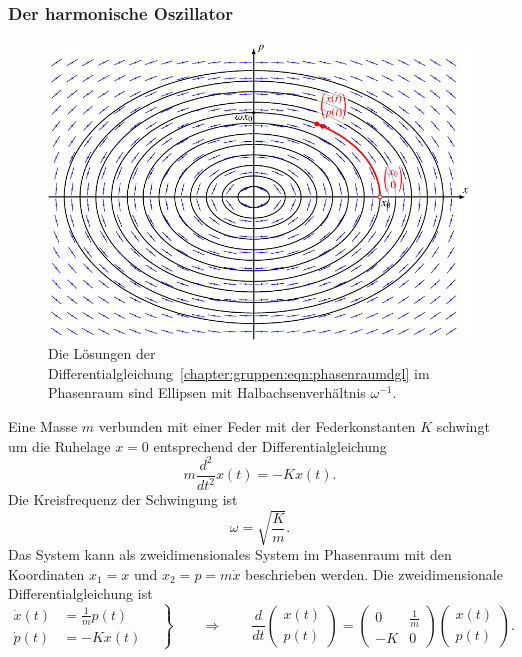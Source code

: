 \subsubsection{Der harmonische Oszillator}
\begin{figure}
\centering
\includegraphics{chapters/60-gruppen/images/phasenraum.pdf}
\caption{Die Lösungen der
Differentialgleichung~\eqref{chapter:gruppen:eqn:phasenraumdgl}
im Phasenraum sind Ellipsen mit Halbachsenverhältnis $\omega^{-1}$.
\label{chapter:gruppen:fig:phasenraum}}
\end{figure}
Eine Masse $m$ verbunden mit einer Feder mit der Federkonstanten $K$
schwingt um die Ruhelage $x=0$ entsprechend der Differentialgleichung
\[
m\frac{d^2}{dt^2} x(t) =  -Kx(t).
\]
Die Kreisfrequenz der Schwingung ist
\[
\omega = \sqrt{\frac{K}{m}}.
\]
Das System kann als zweidimensionales System im Phasenraum mit den 
Koordinaten $x_1=x$ und $x_2=p=m\dot{x}$ beschrieben werden.
Die zweidimensionale Differentialgleichung ist
\begin{equation}
\left.
\begin{aligned}
\dot{x}(t) &= \frac{1}{m}p(t)\\
\dot{p}(t) &= -Kx(t) 
\end{aligned}
\quad
\right\}
\qquad\Rightarrow\qquad
\frac{d}{dt}
\begin{pmatrix}x(t)\\p(t)\end{pmatrix}
=
\begin{pmatrix}
0&\frac{1}{m}\\
-K&0
\end{pmatrix}
\begin{pmatrix}x(t)\\p(t)\end{pmatrix}.
\label{chapter:gruppen:eqn:phasenraumdgl}
\end{equation}
